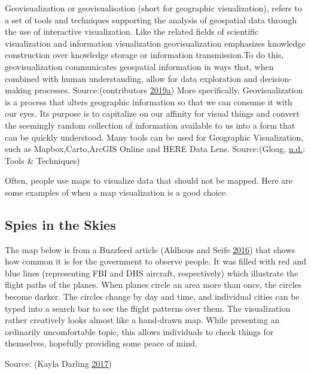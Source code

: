 \documentclass[]{book}
\begin{document}
Geovisualization or geovisualisation (short for geographic visualization), refers to a set of tools and techniques supporting the analysis of geospatial data through the use of interactive visualization.
Like the related fields of scientific visualization and information visualization geovisualization emphasizes knowledge construction over knowledge storage or information transmission.To do this, geovisualization communicates geospatial information in ways that, when combined with human understanding, allow for data exploration and decision-making processes.
Source:(contributors \protect\hyperlink{ref-Wikipedia}{2019}\protect\hyperlink{ref-Wikipedia}{a})
More specifically, Geovisualization is a process that alters geographic information so that we can consume it with our eyes. Its purpose is to capitalize on our affinity for visual things and convert the seemingly random collection of information available to us into a form that can be quickly understood. Many tools can be used for Geographic Visualization, such as Mapbox,Carto,ArcGIS Online and HERE Data Lens.
Source:(Gloag, \protect\hyperlink{ref-Geovisualization}{n.d.}: Tools \& Techniques)

Often, people use maps to visualize data that should not be mapped. Here are some examples of when a map visualization is a good choice.

\hypertarget{spies-in-the-skies}{%
\subsection{Spies in the Skies}\label{spies-in-the-skies}}

The map below is from a Buzzfeed article (Aldhous and Seife \protect\hyperlink{ref-spies_sky}{2016}) that shows how common it is for the government to observe people. It was filled with red and blue lines (representing FBI and DHS aircraft, respectively) which illustrate the flight paths of the planes. When planes circle an area more than once, the circles become darker. The circles change by day and time, and individual cities can be typed into a search bar to see the flight patterns over them. The visualization rather creatively looks almost like a hand-drawn map. While presenting an ordinarily uncomfortable topic, this allows individuals to check things for themselves, hopefully providing some peace of mind.

Source: (Kayla Darling \protect\hyperlink{ref-cool_data}{2017})
\end{document}
